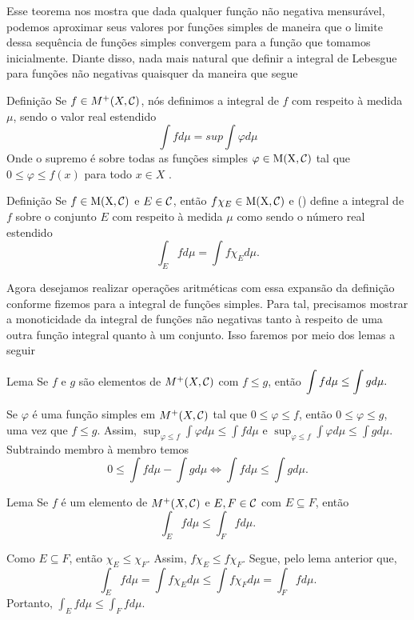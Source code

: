 Esse teorema nos mostra que dada qualquer função não negativa mensurável, podemos aproximar seus valores por funções simples de maneira que o limite dessa sequência de funções simples convergem para a função que tomamos inicialmente.
Diante disso, nada mais natural que definir a integral de Lebesgue para funções não negativas quaisquer da maneira que segue
\begin{env}{Definição}
	\label{def:integral de uma função qualquer não negativa}
	Se $f \in M^+(X,\operatorname{\mathcal{C}})$, nós definimos a integral de $f$ com respeito à medida $\mu$, sendo o valor real estendido
	$$
	\int f d\mu = sup \int \varphi d\mu
	$$
	Onde o supremo é sobre todas as funções simples $\varphi \in \operatorname{M(X, \mathcal{C} )}$ tal que  $0 \leq \varphi \leq f(x)$ para todo $x \in X$
	\cite{bartle}. 
\end{env}
\begin{env}{Definição}
	\label{def: integral de uma função não neg com respeito a um conjunto específico}
	Se $f \in \operatorname{M(X, \mathcal{C} )}$ e $E \in \operatorname{\mathcal{C}}$, então $f\chi_{E} \in \operatorname{M(X, \mathcal{C} )}$ e \citeauthor{bartle} (\citeyear{bartle}) define a integral de $f$ sobre o conjunto $E$ com respeito à medida $\mu$ como sendo o número real estendido
	$$
	\displaystyle \int_E f d\mu = \int f\chi_E d\mu.
	$$
\end{env}

Agora desejamos realizar operações aritméticas com essa expansão da definição conforme fizemos para a integral de funções simples.
Para tal, precisamos mostrar a monoticidade da integral de funções não negativas tanto à respeito de uma outra função integral quanto à um conjunto.
Isso faremos por meio dos lemas a seguir

\begin{env}{Lema}
	\label{lem:monoticiadade da integral de funções não negativas}
	Se $f$ e $g$ são elementos de $M^+(X,\operatorname{\mathcal{C}})$ com $f \leq g$, então 
	$ \displaystyle
	\displaystyle\int fd\mu \leq \int g d\mu.
	$
\end{env}
\begin{prova}
	Se $\varphi$ é uma função simples em $M^+(X,\operatorname{\mathcal{C}})$ tal que 
	$0 \leq \varphi \leq f$, então $0 \leq \varphi \leq g$, uma vez que $f \leq g$.
	Assim, 
	$\displaystyle\sup_{\varphi \leq f} \int\varphi d\mu \leq \int f d\mu$ e
	$\displaystyle\sup_{\varphi \leq f} \int\varphi d\mu \leq \int g d\mu$.
	Subtraindo membro à membro temos 
	$$
	0 \leq  \int f d\mu  - \int g d\mu
	\Leftrightarrow
	\int f d\mu \leq \int g d\mu.
	$$
	
\end{prova}
\begin{env}{Lema}
	\label{lem:monoticiadade da integral com conjunto em funções não negativas}
	Se $f$ é um elemento de $M^+(X,\operatorname{\mathcal{C}})$ e $E,F \in \operatorname{\mathcal{C}}$ com $E \subseteq F$, então 
	$$
	\int_E fd\mu \leq \int_F f d\mu.
	$$
	\vspace{-0.2cm}
\end{env}
\begin{prova}
	Como $E \subseteq F$, então $\chi_E \leq \chi_F$.
	Assim, $f\chi_E \leq f\chi_F$.
	Segue, pelo lema anterior que, 
	$$
	\int_E f d\mu 
	=
	\int f\chi_E d\mu
	\leq 
	\int f\chi_F d\mu
	=
	\int_F f d\mu.
	$$
	Portanto, $ \displaystyle 
	\int_E f d\mu 
	\leq 
	\int_F f d\mu.
	$
\end{prova}

